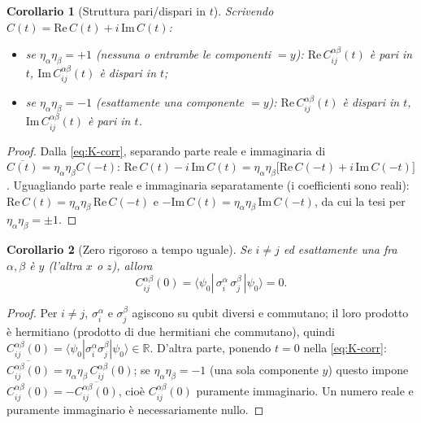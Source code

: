 \documentclass[11pt,a4paper]{article}
\newtheorem{corollario}{Corollario}
\begin{document}
\begin{corollario}[Struttura pari/dispari in $t$]
\label{cor:parita-t}
Scrivendo $C(t)=\mathrm{Re}\,C(t) + i\,\mathrm{Im}\,C(t)$:
\begin{itemize}
\item se $\eta_\alpha\eta_\beta=+1$ (nessuna o entrambe le componenti $=y$): $\mathrm{Re}\,C_{ij}^{\alpha\beta}(t)$
è \emph{pari} in $t$, $\mathrm{Im}\,C_{ij}^{\alpha\beta}(t)$ è \emph{dispari} in $t$;
\item se $\eta_\alpha\eta_\beta=-1$ (esattamente una componente $=y$): $\mathrm{Re}\,C_{ij}^{\alpha\beta}(t)$
è \emph{dispari} in $t$, $\mathrm{Im}\,C_{ij}^{\alpha\beta}(t)$ è \emph{pari} in $t$.
\end{itemize}
\end{corollario}

\begin{proof}
Dalla \eqref{eq:K-corr}, separando parte reale e immaginaria di $\overline{C(t)}=\eta_\alpha\eta_\beta C(-t)$:
$\mathrm{Re}\,C(t) - i\,\mathrm{Im}\,C(t) = \eta_\alpha\eta_\beta\big[\mathrm{Re}\,C(-t)+i\,\mathrm{Im}\,C(-t)\big]$.
Uguagliando parte reale e immaginaria separatamente (i coefficienti sono reali):
$\mathrm{Re}\,C(t)=\eta_\alpha\eta_\beta\,\mathrm{Re}\,C(-t)$ e
$-\mathrm{Im}\,C(t)=\eta_\alpha\eta_\beta\,\mathrm{Im}\,C(-t)$, da cui la tesi per $\eta_\alpha\eta_\beta=\pm1$.
\end{proof}

\begin{corollario}[Zero rigoroso a tempo uguale]
\label{cor:zero-t0}
Se $i\neq j$ ed esattamente una fra $\alpha,\beta$ è $y$ (l'altra $x$ o $z$), allora
\begin{equation}
C_{ij}^{\alpha\beta}(0) = \langle\psi_0|\,\sigma_i^\alpha\,\sigma_j^\beta\,|\psi_0\rangle = 0.
\end{equation}
\end{corollario}

\begin{proof}
Per $i\neq j$, $\sigma_i^\alpha$ e $\sigma_j^\beta$ agiscono su qubit diversi e commutano; il
loro prodotto è hermitiano (prodotto di due hermitiani che commutano), quindi
$C_{ij}^{\alpha\beta}(0)=\langle\psi_0|\sigma_i^\alpha\sigma_j^\beta|\psi_0\rangle\in\mathbb R$.
D'altra parte, ponendo $t=0$ nella \eqref{eq:K-corr}:
$\overline{C_{ij}^{\alpha\beta}(0)}=\eta_\alpha\eta_\beta\,C_{ij}^{\alpha\beta}(0)$; se
$\eta_\alpha\eta_\beta=-1$ (una sola componente $y$) questo impone
$C_{ij}^{\alpha\beta}(0)=-\overline{C_{ij}^{\alpha\beta}(0)}$, cioè $C_{ij}^{\alpha\beta}(0)$
puramente immaginario. Un numero reale e puramente immaginario è necessariamente nullo.
\end{proof}
\end{document}
